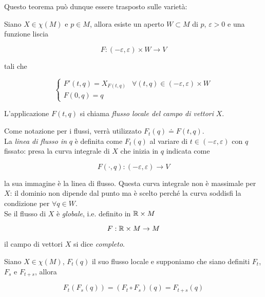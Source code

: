 Questo teorema può dunque essere trasposto sulle varietà:

\begin{theorem}\label{flux-var}
	Siano $ X \in \chi(M) $ e $ p \in M $, allora esiste un aperto $ W \subset M $ di $ p $, $ \varepsilon > 0 $ e una funzione liscia
	
	\begin{equation}
		F : (-\varepsilon,\varepsilon) \times W \to V
	\end{equation}

	tali che
	
	\begin{equation}
		\begin{cases}
			F'(t,q) = X_{F(t,q)} & \forall (t,q) \in (-\varepsilon,\varepsilon) \times W\\
			F(0,q) = q
		\end{cases}
	\end{equation}

	L'applicazione $ F(t,q) $ si chiama \textit{flusso locale del campo di vettori} $ X $.
\end{theorem}

Come notazione per i flussi, verrà utilizzato $ F_{t}(q) \doteq F(t,q) $.\\
La \textit{linea di flusso in} $ q $ è definita come $ F_{t}(q) $ al variare di $ t \in (-\varepsilon,\varepsilon) $ con $ q $ fissato: presa la curva integrale di $ X $ che inizia in $ q $ indicata come

\begin{equation}
	F(\cdot,q) : (-\varepsilon,\varepsilon) \to V
\end{equation}

la sua immagine è la linea di flusso. Questa curva integrale non è massimale per $ X $: il dominio non dipende dal punto ma è scelto perché la curva soddisfi la condizione per $ \forall q \in W $.\\
Se il flusso di $ X $ è \textit{globale}, i.e. definito in $ \mathbb{R} \times M $

\begin{equation}
	F : \mathbb{R} \times M \to M
\end{equation}

il campo di vettori $ X $ si dice \textit{completo}.

\begin{definition}
	Siano $ X \in \chi(M) $, $ F_{t}(q) $ il suo flusso locale e supponiamo che siano definiti $ F_{t} $, $ F_{s} $ e $ F_{t+s} $, allora
	
	\begin{equation}
		F_{t}(F_{s}(q)) = (F_{t} \circ F_{s})(q) = F_{t+s}(q)
	\end{equation}
\end{definition}

